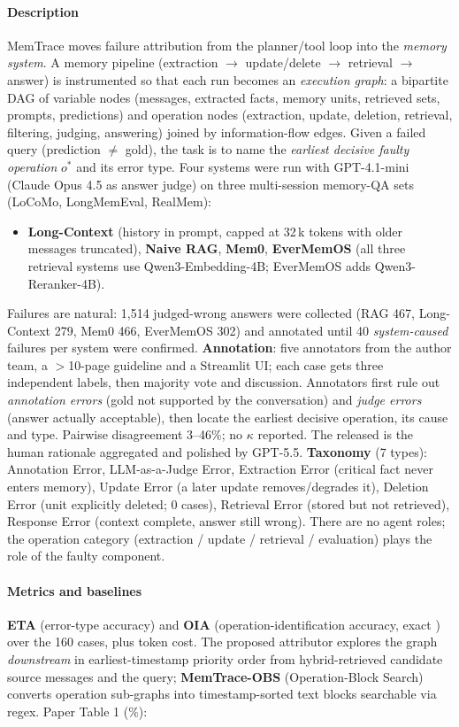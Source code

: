 \paragraph{Description} MemTrace moves failure attribution from the planner/tool loop into the \emph{memory system}. A memory pipeline (extraction $\to$ update/delete $\to$ retrieval $\to$ answer) is instrumented so that each run becomes an \emph{execution graph}: a bipartite DAG of variable nodes (messages, extracted facts, memory units, retrieved sets, prompts, predictions) and operation nodes (extraction, update, deletion, retrieval, filtering, judging, answering) joined by information-flow edges. Given a failed query (prediction $\neq$ gold), the task is to name the \emph{earliest decisive faulty operation} $o^*$ and its error type. Four systems were run with GPT-4.1-mini (Claude Opus 4.5 as answer judge) on three multi-session memory-QA sets (LoCoMo, LongMemEval, RealMem):
\begin{itemize}
\item \textbf{Long-Context} (history in prompt, capped at 32\,k tokens with older messages truncated), \textbf{Naive RAG}, \textbf{Mem0}, \textbf{EverMemOS} (all three retrieval systems use Qwen3-Embedding-4B; EverMemOS adds Qwen3-Reranker-4B).
\end{itemize}
Failures are natural: 1,514 judged-wrong answers were collected (RAG 467, Long-Context 279, Mem0 466, EverMemOS 302) and annotated until 40 \emph{system-caused} failures per system were confirmed. \textbf{Annotation}: five annotators from the author team, a $>$10-page guideline and a Streamlit UI; each case gets three independent labels, then majority vote and discussion. Annotators first rule out \emph{annotation errors} (gold not supported by the conversation) and \emph{judge errors} (answer actually acceptable), then locate the earliest decisive operation, its cause and type. Pairwise disagreement 3--46\%; no $\kappa$ reported. The released  is the human rationale aggregated and polished by GPT-5.5. \textbf{Taxonomy} (7 types): Annotation Error, LLM-as-a-Judge Error, Extraction Error (critical fact never enters memory), Update Error (a later update removes/degrades it), Deletion Error (unit explicitly deleted; 0 cases), Retrieval Error (stored but not retrieved), Response Error (context complete, answer still wrong). There are no agent roles; the operation category (extraction / update / retrieval / evaluation) plays the role of the faulty component.

\paragraph{Metrics and baselines} \textbf{ETA} (error-type accuracy) and \textbf{OIA} (operation-identification accuracy, exact ) over the 160 cases, plus token cost. The proposed attributor explores the graph \emph{downstream} in earliest-timestamp priority order from hybrid-retrieved candidate source messages and the query; \textbf{MemTrace-OBS} (Operation-Block Search) converts operation sub-graphs into timestamp-sorted text blocks searchable via regex. Paper Table 1 (\%):

